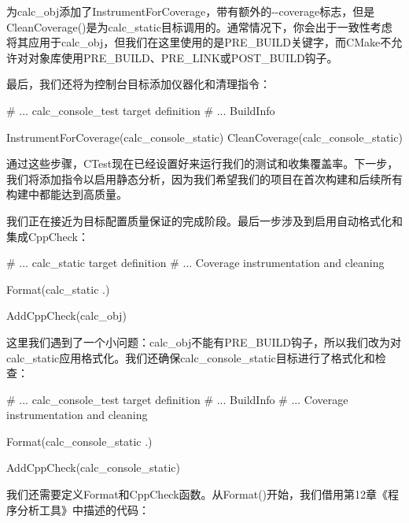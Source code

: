 为calc\_obj添加了InstrumentForCoverage，带有额外的-{}-coverage标志，但是CleanCoverage()是为calc\_static目标调用的。通常情况下，你会出于一致性考虑将其应用于calc\_obj，但我们在这里使用的是PRE\_BUILD关键字，而CMake不允许对对象库使用PRE\_BUILD、PRE\_LINK或POST\_BUILD钩子。

最后，我们还将为控制台目标添加仪器化和清理指令：


\begin{cmake}
# ... calc_console_test target definition
# ... BuildInfo

InstrumentForCoverage(calc_console_static)
CleanCoverage(calc_console_static)
\end{cmake}

通过这些步骤，CTest现在已经设置好来运行我们的测试和收集覆盖率。下一步，我们将添加指令以启用静态分析，因为我们希望我们的项目在首次构建和后续所有构建中都能达到高质量。


我们正在接近为目标配置质量保证的完成阶段。最后一步涉及到启用自动格式化和集成CppCheck：


\begin{cmake}
# ... calc_static target definition
# ... Coverage instrumentation and cleaning

Format(calc_static .)

AddCppCheck(calc_obj)
\end{cmake}

这里我们遇到了一个小问题：calc\_obj不能有PRE\_BUILD钩子，所以我们改为对calc\_static应用格式化。我们还确保calc\_console\_static目标进行了格式化和检查：


\begin{cmake}
# ... calc_console_test target definition
# ... BuildInfo
# ... Coverage instrumentation and cleaning

Format(calc_console_static .)

AddCppCheck(calc_console_static)
\end{cmake}

我们还需要定义Format和CppCheck函数。从Format()开始，我们借用第12章《程序分析工具》中描述的代码：



